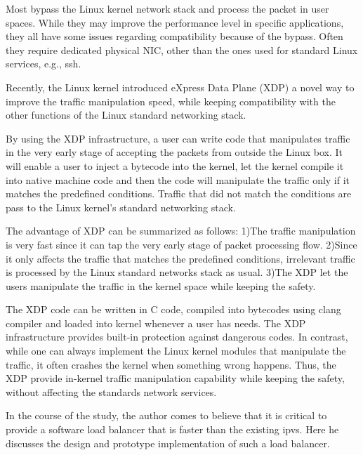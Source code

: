 Most bypass the Linux kernel network stack and process the packet in user spaces.
While they may improve the performance level in specific applications, they all have some issues regarding compatibility because of the bypass.
Often they require dedicated physical NIC, other than the ones used for standard Linux services, e.g., ssh.


Recently, the Linux kernel introduced eXpress Data Plane (XDP)\cite{bertin2017xdp} a novel way to improve the traffic manipulation speed, while keeping compatibility with the other functions of the Linux standard networking stack.

By using the XDP infrastructure, a user can write code that manipulates traffic in the very early stage of accepting the packets from outside the Linux box.
It will enable a user to inject a bytecode into the kernel, let the kernel compile it into native machine code and then the code will manipulate the traffic only if it matches the predefined conditions.
Traffic that did not match the conditions are pass to the Linux kernel's standard networking stack.

The advantage of XDP can be summarized as follows:
1)The traffic manipulation is very fast since it can tap the very early stage of packet processing flow.
2)Since it only affects the traffic that matches the predefined conditions, irrelevant traffic is processed by the Linux standard networks stack as usual.
3)The XDP let the users manipulate the traffic in the kernel space while keeping the safety.

The XDP code can be written in C code, compiled into bytecodes using clang compiler and loaded into kernel whenever a user has needs.
The XDP infrastructure provides built-in protection against dangerous codes.
In contrast, while one can always implement the Linux kernel modules that manipulate the traffic, it often crashes the kernel when something wrong happens.
Thus, the XDP provide in-kernel traffic manipulation capability while keeping the safety, without affecting the standards network services.

In the course of the study, the author comes to believe that it is critical to provide a software load balancer that is faster than the existing ipvs.
Here he discusses the design and prototype implementation of such a load balancer.





